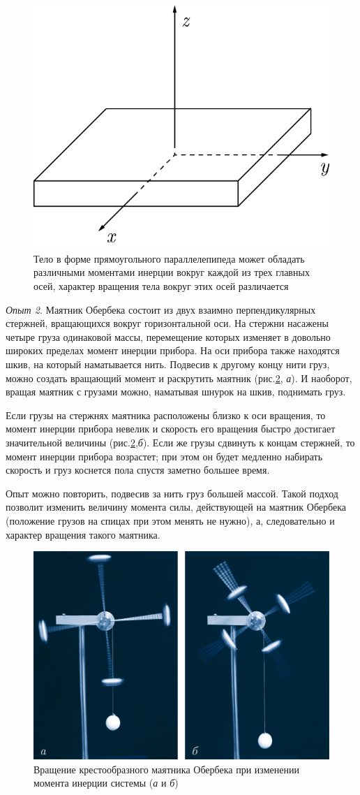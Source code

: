 \documentclass[All.tex]{subfiles}
\begin{document}
		\begin{figure}[H] 	
		\centering 	
		\includegraphics[width=0.35\linewidth]{oberbeck-2.png}
		\caption{Тело в форме прямоугольного параллелепипеда может обладать различными моментами инерции вокруг каждой из трех главных осей, характер вращения тела вокруг этих осей различается}
		\label{oberbeck-2}
	\end{figure}

	\textit{Опыт 2}. Маятник Обербека состоит из двух взаимно перпендикулярных стержней, вращающихся вокруг горизонтальной оси.
На стержни насажены четыре груза одинаковой массы, перемещение которых изменяет в довольно широких пределах момент инерции прибора. 
На оси прибора также находятся шкив, на который наматывается нить.
Подвесив к другому концу нити груз, можно создать вращающий момент и раскрутить маятник (рис.\ref{oberbeck-3}, \textit{а}).
И наоборот, вращая маятник с грузами можно, наматывая шнурок на шкив, поднимать груз.

Если грузы на стержнях маятника расположены близко к оси вращения, то момент инерции прибора невелик и скорость его вращения быстро достигает значительной величины (рис.\ref{oberbeck-3},\textit{б}).
Если же грузы сдвинуть к концам стержней, то момент инерции прибора возрастет; при этом он будет медленно набирать скорость и груз коснется пола спустя заметно большее время.

Опыт можно повторить, подвесив за нить груз большей массой.
Такой подход позволит изменить величину момента силы, действующей на маятник Обербека (положение грузов на спицах при этом менять не нужно), а, следовательно и характер вращения такого маятника.
	
	\begin{figure}[H] 	
		\centering 	
		\includegraphics[width=0.6\linewidth]{oberbeck-3.png}
		\caption{Вращение крестообразного маятника Обербека при изменении момента инерции системы (\textit{а} и \textit{б})}
		\label{oberbeck-3}
	\end{figure}
	
\end{document}
